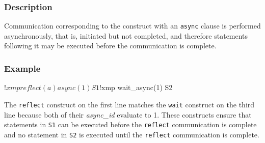 \subsubsection*{Description}

Communication corresponding to the construct with an {\tt async} clause
is performed asynchronously, that is, initiated but not completed,
and therefore statements following it may be executed before the
communication is complete.

%

\subsubsection*{Example}

\begin{XFexample}
!$xmp reflect (a) async(1)
      S1
!$xmp wait_async(1)
      S2
\end{XFexample}

The {\tt reflect} construct on the first line matches the {\tt wait}
construct on the third line because both of their {\it async\_id}
evaluate to 1.
%
These constructs ensure that statements in {\tt S1} can be executed
before the {\tt reflect} communication is complete and no statement in
{\tt S2} is executed until the {\tt reflect} communication is
complete.
